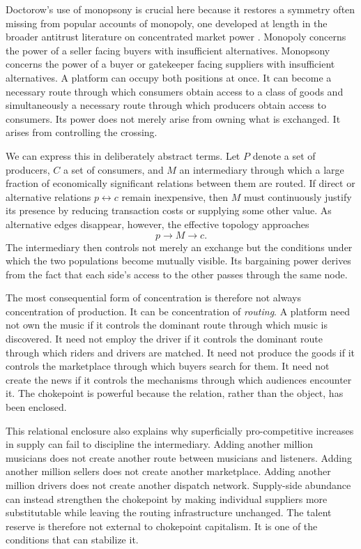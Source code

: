 \documentclass[11pt]{article}
\begin{document}
Doctorow's use of monopsony \citep{doctorowgiblin2022chokepoint,azarmarinescu2022monopsony} is crucial here because it restores a symmetry often missing from popular accounts of monopoly, one developed at length in the broader antitrust literature on concentrated market power \citep{wu2018curse,stoller2019goliath,posner2018radicalmarkets}. Monopoly concerns the power of a seller facing buyers with insufficient alternatives. Monopsony concerns the power of a buyer or gatekeeper facing suppliers with insufficient alternatives. A platform can occupy both positions at once. It can become a necessary route through which consumers obtain access to a class of goods and simultaneously a necessary route through which producers obtain access to consumers. Its power does not merely arise from owning what is exchanged. It arises from controlling the crossing.

We can express this in deliberately abstract terms. Let \(P\) denote a set of producers, \(C\) a set of consumers, and \(M\) an intermediary through which a large fraction of economically significant relations between them are routed. If direct or alternative relations \(p\leftrightarrow c\) remain inexpensive, then \(M\) must continuously justify its presence by reducing transaction costs or supplying some other value. As alternative edges disappear, however, the effective topology approaches
\[
p \longrightarrow M \longrightarrow c.
\]
The intermediary then controls not merely an exchange but the conditions under which the two populations become mutually visible. Its bargaining power derives from the fact that each side's access to the other passes through the same node.

The most consequential form of concentration is therefore not always concentration of production. It can be concentration of \emph{routing}. A platform need not own the music if it controls the dominant route through which music is discovered. It need not employ the driver if it controls the dominant route through which riders and drivers are matched. It need not produce the goods if it controls the marketplace through which buyers search for them. It need not create the news if it controls the mechanisms through which audiences encounter it. The chokepoint is powerful because the relation, rather than the object, has been enclosed.

This relational enclosure also explains why superficially pro-competitive increases in supply can fail to discipline the intermediary. Adding another million musicians does not create another route between musicians and listeners. Adding another million sellers does not create another marketplace. Adding another million drivers does not create another dispatch network. Supply-side abundance can instead strengthen the chokepoint by making individual suppliers more substitutable while leaving the routing infrastructure unchanged. The talent reserve is therefore not external to chokepoint capitalism. It is one of the conditions that can stabilize it.
\end{document}
